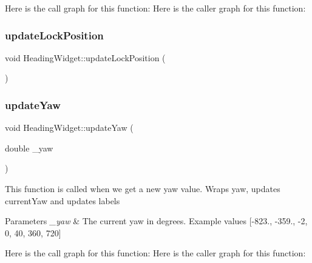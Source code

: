 Here is the call graph for this function\+:
Here is the caller graph for this function\+:
\mbox{\label{class_heading_widget_abd5cbfa77478ba28e70c44f67fa6bd6f}} 
\subsubsection{\texorpdfstring{update\+Lock\+Position}{updateLockPosition}}
{\footnotesize\ttfamily void Heading\+Widget\+::update\+Lock\+Position (\begin{DoxyParamCaption}{ }\end{DoxyParamCaption})\hspace{0.3cm}{\ttfamily [slot]}}

\mbox{\label{class_heading_widget_a0ee18df2412d99bd9c2effe300679a6d}} 
\subsubsection{\texorpdfstring{update\+Yaw}{updateYaw}}
{\footnotesize\ttfamily void Heading\+Widget\+::update\+Yaw (\begin{DoxyParamCaption}\item[{double}]{\+\_\+yaw }\end{DoxyParamCaption})\hspace{0.3cm}{\ttfamily [slot]}}

This function is called when we get a new yaw value.  Wraps yaw, updates current\+Yaw and updates labels 
\begin{DoxyParams}{Parameters}
{\em \+\_\+yaw} & The current yaw in degrees. Example values \mbox{[}-\/823., -\/359., -\/2, 0, 40, 360, 720\mbox{]} \\
\hline
\end{DoxyParams}
Here is the call graph for this function\+:
Here is the caller graph for this function\+:
\mbox{\label{class_heading_widget_a4ac443944e857d2f9744704429ce4577}} 
